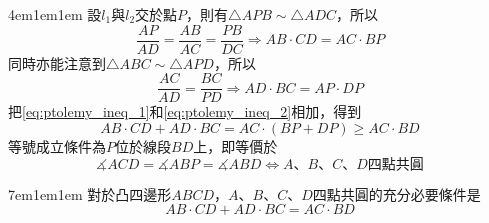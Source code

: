 \documentclass[12pt]{article}
\begin{document}
\begin{mybox}[證明]{4em}{1em}{1em}
    設$l_1$與$l_2$交於點$P$，則有$\triangle{APB}\sim\triangle{ADC}$，所以
    \begin{equation}
        \frac{AP}{AD}=\frac{AB}{AC}=\frac{PB}{DC} \Rightarrow AB\cdot CD=AC\cdot BP\label{eq:ptolemy_ineq_1}
    \end{equation}
    同時亦能注意到$\triangle{ABC}\sim\triangle{APD}$，所以
    \begin{equation}
       \frac{AC}{AD}=\frac{BC}{PD} \Rightarrow AD\cdot BC=AP\cdot DP\label{eq:ptolemy_ineq_2}
    \end{equation}
    把\eqref{eq:ptolemy_ineq_1}和\eqref{eq:ptolemy_ineq_2}相加，得到
    \begin{equation}
        AB\cdot CD + AD\cdot BC = AC\cdot\left(BP + DP\right)\geq AC\cdot BD\label{eq:ptolemy_ineq_3}
    \end{equation}
    等號成立條件為$P$位於線段$BD$上，即等價於
    $$\measuredangle{ACD}=\measuredangle{ABP}=\measuredangle{ABD}\Leftrightarrow \text{$A$、$B$、$C$、$D$四點共圓}$$
\end{mybox}
\begin{mybox}[托勒密定理]{7em}{1em}{1em}
    對於凸四邊形$ABCD$，$A$、$B$、$C$、$D$四點共圓的充分必要條件是
    $$AB \cdot CD + AD \cdot BC = AC \cdot BD$$
\end{mybox}
\end{document}
